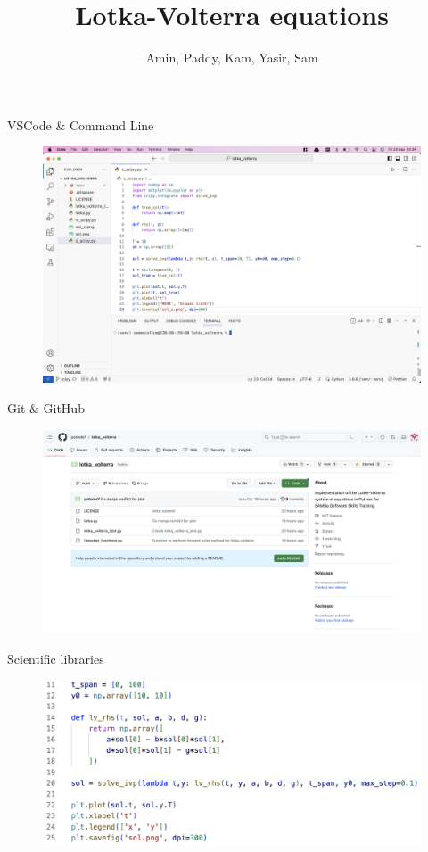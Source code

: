 \documentclass{beamer}
\title{\textbf{Lotka-Volterra equations}}
\author{Amin, Paddy, Kam, Yasir, Sam}
\begin{document}
    \titlepage
    
    \begin{frame}{VSCode \& Command Line}
        \begin{figure}
            \centering
            \includegraphics[width=\textwidth]{vscode.png}
            \label{fig:vscode}
        \end{figure}
    \end{frame}

    \begin{frame}{Git \& GitHub}
        \begin{figure}
            \centering
            \includegraphics[width=\textwidth]{github.png}
            \label{fig:github}
        \end{figure}
    \end{frame}

    \begin{frame}{Scientific libraries}
        \begin{figure}
            \centering
            \includegraphics[width=\textwidth]{scientific-libraries.png}
            \label{fig:scilib}
        \end{figure}
    \end{frame}
    
\end{document}
